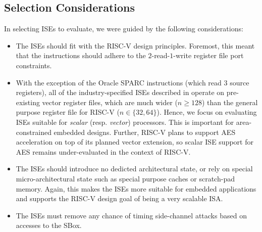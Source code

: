 
\subsection{Selection Considerations}

In selecting ISEs to evaluate, we were guided by the following
considerations:

\begin{itemize}
\item The ISEs should fit with the RISC-V design principles.
      Foremost, this meant that the instructions should adhere to
      the $2$-read-$1$-write register file port constraints.
\item With the exception of the Oracle SPARC
      instructions (which read $3$ source registers),
      all of the industry-specified ISEs described in
       operate on pre-existing vector
      register files, which are much wider ($n\ge128$) than the
      general purpose register file for RISC-V ($n\in\{32,64\}$).
      Hence, we focus on evaluating ISEs suitable for {\em scalar}
      (resp. {\em vector}) processors.
      This is important for area-constrained embedded designs.
      Further, RISC-V plans to support AES acceleration on top of
      its planned vector extension, so scalar ISE support for
      AES remains under-evaluated in the context of RISC-V.
\item The ISEs should introduce no dedicted architectural state, or
      rely on special micro-architectural state such as special
      purpose caches or scratch-pad memory.
      Again, this makes the ISEs more suitable for embedded
      applications and supports the RISC-V design goal of being
      a very scalable ISA.
\item The ISEs must remove any chance of timing side-channel attacks
      based on accesses to the SBox.
\end{itemize}


